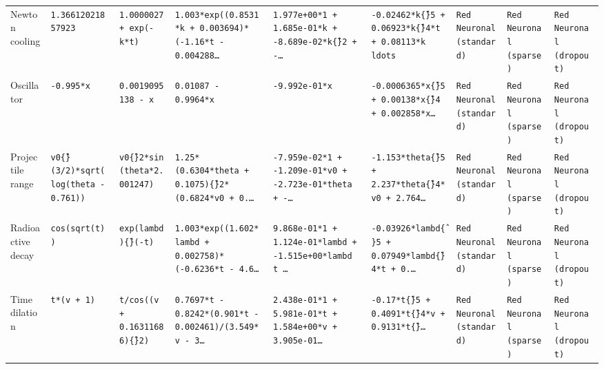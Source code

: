 \begin{table}[htbp]
\begin{adjustbox}{max width=\linewidth}
\begin{tabular}{p{2.4cm} p{2.6cm} p{2.6cm} p{2.6cm} p{2.6cm} p{2.6cm} p{2.6cm} p{2.6cm} p{2.6cm}}
    \addlinespace[2pt]
    Newton cooling & \cellcolor{ood3}\texttt{1.36612021857923} & \cellcolor{ood1}\texttt{1.0000027 + exp(-k*t)} & \cellcolor{ood1}\texttt{1.003*exp((0.8531*k + 0.003694)*(-1.16*t - 0.004288\ldots} & \cellcolor{ood5}\texttt{1.977e+00*1 + 1.685e-01*k + -8.689e-02*k\^\{\}2 + -\ldots} & \cellcolor{ood5}\texttt{-0.02462*k\^\{\}5 + 0.06923*k\^\{\}4*t + 0.08113*k\\ldots} & \cellcolor{ood4}\texttt{Red Neuronal (standard)} & \cellcolor{ood4}\texttt{Red Neuronal (sparse)} & \cellcolor{ood4}\texttt{Red Neuronal (dropout)} \\
    \addlinespace[2pt]
    Oscillator & \cellcolor{ood2}\texttt{-0.995*x} & \cellcolor{ood1}\texttt{0.0019095138 - x} & \cellcolor{ood2}\texttt{0.01087 - 0.9964*x} & \cellcolor{ood1}\texttt{-9.992e-01*x} & \cellcolor{ood5}\texttt{-0.0006365*x\^\{\}5 + 0.00138*x\^\{\}4 + 0.002858*x\ldots} & \cellcolor{ood2}\texttt{Red Neuronal (standard)} & \cellcolor{ood4}\texttt{Red Neuronal (sparse)} & \cellcolor{ood3}\texttt{Red Neuronal (dropout)} \\
    \addlinespace[2pt]
    Projectile range & \cellcolor{oodnull}\texttt{v0\^\{\}(3/2)*sqrt(log(theta - 0.761))} & \cellcolor{ood2}\texttt{v0\^\{\}2*sin(theta*2.001247)} & \cellcolor{ood3}\texttt{1.25*(0.6304*theta + 0.1075)\^\{\}2*(0.6824*v0 + 0.\ldots} & \cellcolor{ood4}\texttt{-7.959e-02*1 + -1.209e-01*v0 + -2.723e-01*theta + -\ldots} & \cellcolor{ood5}\texttt{-1.153*theta\^\{\}5 + 2.237*theta\^\{\}4*v0 + 2.764\ldots} & \cellcolor{ood5}\texttt{Red Neuronal (standard)} & \cellcolor{ood5}\texttt{Red Neuronal (sparse)} & \cellcolor{ood5}\texttt{Red Neuronal (dropout)} \\
    \addlinespace[2pt]
    Radioactive decay & \cellcolor{ood3}\texttt{cos(sqrt(t))} & \cellcolor{ood1}\texttt{exp(lambd)\^\{\}(-t)} & \cellcolor{ood1}\texttt{1.003*exp((1.602*lambd + 0.002758)*(-0.6236*t - 4.6\ldots} & \cellcolor{ood5}\texttt{9.868e-01*1 + 1.124e-01*lambd + -1.515e+00*lambd t \ldots} & \cellcolor{ood5}\texttt{-0.03926*lambd\^\{\}5 + 0.07949*lambd\^\{\}4*t + 0.\ldots} & \cellcolor{ood4}\texttt{Red Neuronal (standard)} & \cellcolor{ood4}\texttt{Red Neuronal (sparse)} & \cellcolor{ood4}\texttt{Red Neuronal (dropout)} \\
    \addlinespace[2pt]
    Time dilation & \cellcolor{ood5}\texttt{t*(v + 1)} & \cellcolor{ood5}\texttt{t/cos((v + 0.16311686)\^\{\}2)} & \cellcolor{ood4}\texttt{0.7697*t - 0.8242*(0.901*t - 0.002461)/(3.549*v - 3\ldots} & \cellcolor{ood5}\texttt{2.438e-01*1 + 5.981e-01*t + 1.584e+00*v + 3.905e-01\ldots} & \cellcolor{ood5}\texttt{-0.17*t\^\{\}5 + 0.4091*t\^\{\}4*v + 0.9131*t\^\{\}\ldots} & \cellcolor{ood5}\texttt{Red Neuronal (standard)} & \cellcolor{ood5}\texttt{Red Neuronal (sparse)} & \cellcolor{ood5}\texttt{Red Neuronal (dropout)} \\

\end{tabular}
\end{adjustbox}
\end{table}
